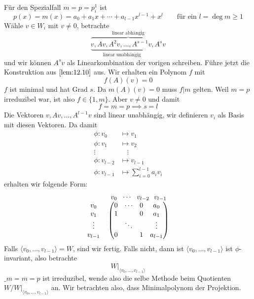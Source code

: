 \documentclass[a4paper, 10pt]{scrbook}
\begin{document}
\begin{ex}
\begin{enumerate}[1{. Schritt}]
			Für den Spezialfall $m=p=p_i^1$ ist
			\[
				p(x) = m(x) = a_0+a_1x+\dotsb + a_{l-1}x^{l-1} +x^l \qquad \text{für ein $l=\deg m\ge 1$}
			\]
			Wähle $v\in W_i$ mit $v\neq 0$, betrachte
			\[
				\overbrace{\underbrace{v,Av,A^2v,\dotsc,A^{s-1}v}_{\text{ linear unabhängig}},A^sv}^{\text{linear abhängig}}
			\]
			und wir können $A^sv$ als Linearkombination der vorigen schreiben.
			Führe jetzt die Konstruktion aus $\ref{lem:12.10}$ aus.
			Wir erhalten ein Polynom $f$ mit
			\[
				f(A)(v)=0
			\]
			$f$ ist minimal und hat Grad $s$.
			Da $m(A)(v)=0$ muss $f|m$ gelten.
			Weil $m=p$ irreduzibel war, ist also $f\in \{1,m\}$.
			Aber $v\neq 0$ und damit
			\[
				f=m=p \implies s=l
			\]
			Die Vektoren $v,Av,\dotsc,A^{l-1}v$ sind linear unabhängig, wir definieren $v_i$ als Basis mit diesen Vektoren.
			Da damit
			\begin{align*}
				\phi:v_0 &\mapsto v_1\\
				\phi:v_1 &\mapsto v_2\\
				\vdots \quad & \quad \vdots\\
				\phi:v_{l-2} &\mapsto v_{l-1}\\
				\phi:v_{l-1} &\mapsto \sum_{i=0}^{l-1} a_iv_i
			\end{align*}
			erhalten wir folgende Form:
			\[
				\begin{tabular}{*{3}{>{$}c<{$}}}
					& \begin{matrix} v_0 & \!\cdots\! & v_{l-2}\!  & \!v_{l-1}  \end{matrix} \\
				 \begin{matrix} v_0 \\ v_1 \\ \vdots \\ v_{l-1} \end{matrix} &
				 \begin{pmatrix} 0 & \cdots  & 0 & a_0 \\ 1 &  & 0 & a_1 \\ & \ddots &  & \vdots \\ 0 &  & 1 & a_{l-1} \end {pmatrix}  
				\end{tabular}
			\]
			Falls $\langle v_0,\dotsc, v_{l-1}\rangle = W$, sind wir fertig.
			Falls nicht, dann ist $\langle v_0,\dotsc, v_{l-1}\rangle$ ist $\phi$-invariant, also betrachte
			\[
				W|_{\langle v_0,\dotsc,v_{l-1}\rangle}
			\]
			$\_m=m=p$ ist irreduzibel, wende also die selbe Methode beim Quotienten $W/W|_{\langle v_0,\dotsc,v_{l-1}\rangle}$ an. Wir betrachten also, dass Minimalpolynom
			der Projektion. %


\end{enumerate}
\end{ex}
\end{document}

